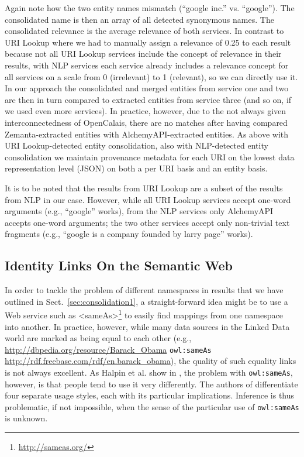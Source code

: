 \documentclass{acm_proc_article-sp}
\begin{document}
Again note how the two entity names mismatch (``google inc.'' vs. ``google''). The consolidated name is then an array of all detected synonymous names. The consolidated relevance is the average relevance of both services. In contrast to URI Lookup where we had to manually assign a relevance of 0.25 to each result because not all URI Lookup services include the concept of relevance in their results, with NLP services each service already includes a relevance concept for all services on a scale from 0 (irrelevant) to 1 (relevant), so we can directly use it. In our approach the consolidated and merged entities from service one and two are then in turn compared to extracted entities from service three (and so on, if we used even more services). In practice, however, due to the not always given interconnectedness of OpenCalais, there are no matches after having compared Zemanta-extracted entities with AlchemyAPI-extracted entities. As above with URI Lookup-detected entity consolidation, also with NLP-detected entity consolidation we maintain provenance metadata for each URI on the lowest data representation level (JSON) on both a per URI basis and an entity basis.  

It is to be noted that the results from URI Lookup are a subset of the results from NLP in our case. However, while all URI Lookup services accept one-word arguments (e.g., ``google'' works), from the NLP services only AlchemyAPI accepts one-word arguments; the two other services accept only non-trivial text fragments (e.g., ``google is a company founded by larry page'' works). 

\subsection{Identity Links On the Semantic Web}\label{sec:sameasorg}
In order to tackle the problem of different namespaces in results that we have outlined in Sect.~\ref{sec:consolidation1}, a straight-forward idea might be to use a Web service such as <sameAs>\footnote{\url{http://sameas.org/}} to easily find mappings from one namespace into another. In practice, however, while many data sources in the Linked Data world are marked as being equal to each other (e.g., \url{http://dbpedia.org/resource/Barack_Obama} \texttt{owl:sameAs} \url{http://rdf.freebase.com/rdf/en.barack_obama}), the quality of such equality links is not always excellent. As Halpin et al. show in \cite{Halpin:SameAs}, the problem with \texttt{owl:sameAs}, however, is that people tend to use it very differently. The authors of \cite{Halpin:SameAs} differentiate four separate usage styles, each with its particular implications. Inference is thus problematic, if not impossible, when the sense of the particular use of \texttt{owl:sameAs} is unknown.
\end{document}

